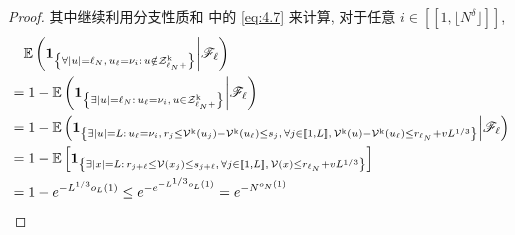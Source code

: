 \begin{proof}
{    }{
        其中继续利用分支性质和 中的 \eqref{eq:4.7} 来计算, 对于任意 $i\in[\![1,\lfloor N^\delta\rfloor]\!]$,
    }
    \begin{align*}
        &\quad
        \mathbb E\left(
            {\bf 1}_{
                \left\{
                    \forall|u|=\ell_N,\,
                    u_\ell=\nu_i:\,
                    u\notin
                    \mathcal Z^{\mathrm{k}}_{\ell_N+}
                \right\}
            }
            \middle|
            \mathscr F_\ell
        \right)
        \\
        &
        =
        1-
        \mathbb E\left(
            {\bf 1}_{
                \left\{
                    \exists|u|=\ell_N:\,
                    u_\ell=\nu_i,\,
                    u\in
                    \mathcal Z^{\mathrm{k}}_{\ell_N+}
                \right\}
            }
            \middle|
            \mathscr F_\ell
        \right)
        \\ &
        =
        1-
        \mathbb E\left(
            {\bf 1}_{
                \left\{
                    \exists|u|=L:\,
                    u_\ell=\nu_i,\,
                    r_j
                    \le
                    \mathcal V^{\mathrm{k}}(u_j)
                    -
                    \mathcal V^{\mathrm{k}}(u_\ell)
                    \le
                    s_j,\,
                    \forall j\in[\![1,L]\!],\,
                    \mathcal V^{\mathrm{k}}(u)
                    -
                    \mathcal V^{\mathrm{k}}(u_\ell)
                    \le
                    r_{\ell_N}+vL^{1/3}
                \right\}
            }
            \middle|
            \mathscr F_\ell
        \right)
        \\ &
        =
        1-
        \mathbb E\left[
            {\bf 1}_{
                \left\{
                    \exists|x|=L:\,
                    r_{j+\ell}
                    \le
                    \mathcal V(x_j)
                    \le
                    s_{j+\ell},\,
                    \forall j\in[\![1,L]\!],\,
                    \mathcal V(x)
                    \le
                    r_{\ell_N}+vL^{1/3}
                \right\}
            }
        \right]
        \\ &
        =
        1-e^{-L^{1/3}o_L(1)}
        \le
        e^{
            -e^{
                -L^{\text{\fontsize{6pt}{5pt}$1/3$}}
                o_{\text{\fontsize{5pt}{5pt}$L$}}{\text{\fontsize{6pt}{5pt}$(1)$}}
            }
        }
        =
        e^{
            -N^{
                o_{\text{\fontsize{5pt}{5pt}$N$}}{\text{\fontsize{6pt}{5pt}$(1)$}}
}}
\end{align*}
\end{proof}
